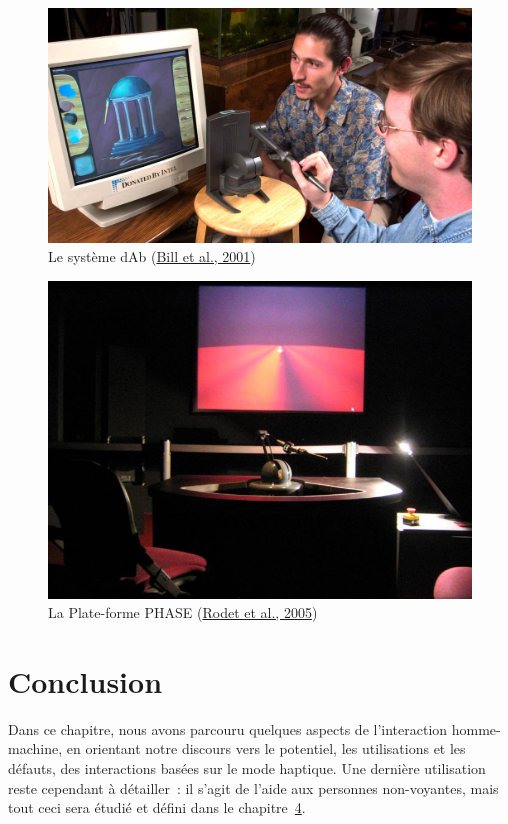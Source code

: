 \documentclass[
]{book}
\begin{document}
\begin{figure}
\centering
\includegraphics{img/dab_system_scheib_baxter-cropped.jpg}
\caption{\label{fig:dab}Le système dAb
(\protect\hyperlink{ref-bill2001interactive}{Bill et al., 2001})}
\end{figure}

\begin{figure}
\centering
\includegraphics{img/InstalPhaseCGP.jpg}
\caption{\label{fig:phase}La Plate-forme PHASE (\protect\hyperlink{ref-rodet2005phase}{Rodet et al., 2005})}
\end{figure}

\hypertarget{conclusion-1}{%
\section{Conclusion}\label{conclusion-1}}

Dans ce chapitre, nous avons parcouru quelques aspects de l'interaction
homme-machine, en orientant notre discours vers le potentiel, les
utilisations et les défauts, des interactions basées sur le mode haptique.
Une dernière utilisation reste cependant à détailler~: il s'agit de l'aide
aux personnes non-voyantes, mais tout ceci sera étudié et défini dans le
chapitre~\href{025-chapitre-4-vers-l-accessibilite.html}{4}.
\end{document}
